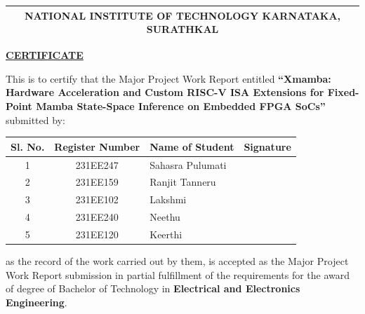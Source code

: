 \documentclass[11pt,a4paper,oneside]{report}
\begin{document}
\clearpage
{}
\vspace*{-1.5cm}

\begin{center}
\begin{tabular}{c}
\textbf{\footnotesize{NATIONAL INSTITUTE OF TECHNOLOGY KARNATAKA, SURATHKAL}}\\\hline
\end{tabular}
\end{center}

\begin{mdframed}[linewidth=1.5pt]
\linespread{1.3}\selectfont
\vspace{0.3cm}

\begin{center}
\textbf{\underline{CERTIFICATE}}\\
\end{center}

\vspace{0.4cm}
This is to certify that the Major Project Work Report entitled \textbf{``Xmamba: Hardware Acceleration and Custom RISC-V ISA Extensions for Fixed-Point Mamba State-Space Inference on Embedded FPGA SoCs''} submitted by:

\vspace{0.4cm}
\begin{center}
\renewcommand{\arraystretch}{2.0}
\begin{tabular}{|c|c|l|p{4.2cm}|}
\hline
\textbf{Sl. No.} & \textbf{Register Number} & \textbf{Name of Student} & \centering\arraybackslash\textbf{Signature} \\ \hline
1 & 231EE247 & Sahasra Pulumati & \\ \hline
2 & 231EE159 & Ranjit Tanneru & \\ \hline
3 & 231EE102 & Lakshmi & \\ \hline
4 & 231EE240 & Neethu & \\ \hline
5 & 231EE120 & Keerthi & \\ \hline
\end{tabular}
\end{center}
\vspace{0.4cm}

as the record of the work carried out by them, is accepted as the Major Project Work Report submission in partial fulfillment of the requirements for the award of degree of Bachelor of Technology in \textbf{Electrical and Electronics Engineering}.


\end{mdframed}
\end{document}
